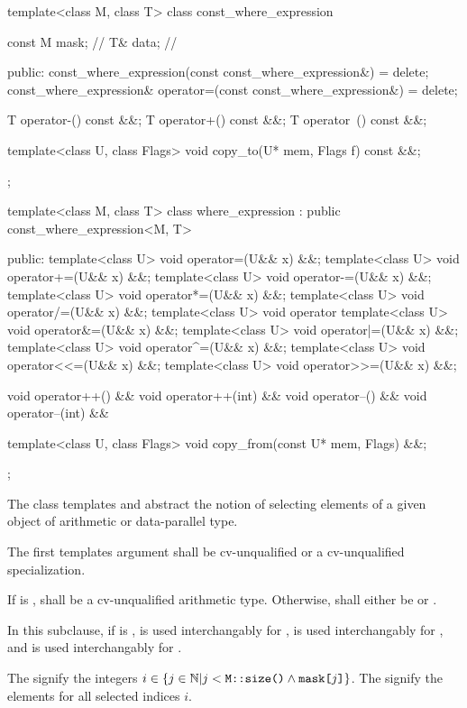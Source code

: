 \begin{codeblock}
template<class M, class T> class const_where_expression {
  const M mask; // \expos
  T& data; // \expos

public:
  const_where_expression(const const_where_expression&) = delete;
  const_where_expression& operator=(const const_where_expression&) = delete;

  T operator-() const &&;
  T operator+() const &&;
  T operator~() const &&;

  template<class U, class Flags> void copy_to(U* mem, Flags f) const &&;
};

template<class M, class T>
class where_expression : public const_where_expression<M, T> {
public:
  template<class U> void operator=(U&& x) &&;
  template<class U> void operator+=(U&& x) &&;
  template<class U> void operator-=(U&& x) &&;
  template<class U> void operator*=(U&& x) &&;
  template<class U> void operator/=(U&& x) &&;
  template<class U> void operator%
  template<class U> void operator&=(U&& x) &&;
  template<class U> void operator|=(U&& x) &&;
  template<class U> void operator^=(U&& x) &&;
  template<class U> void operator<<=(U&& x) &&;
  template<class U> void operator>>=(U&& x) &&;

  void operator++() &&
  void operator++(int) &&
  void operator--() &&
  void operator--(int) &&

  template<class U, class Flags> void copy_from(const U* mem, Flags) &&;
};
\end{codeblock}

\pnum
The class templates  and  abstract the notion of selecting elements of a given object of arithmetic or data-parallel type.

\pnum
The first templates argument  shall be cv-unqualified  or a cv-unqualified  specialization.

\pnum
If  is ,  shall be a cv-unqualified arithmetic type. Otherwise,  shall either be  or .

\pnum
In this subclause, if  is ,  is used interchangably for ,  is used interchangably for , and  is used interchangably for .

\pnum
The  signify the integers $i \in \{j \in \mathbb{N} | j < \texttt{M::size()} \wedge \texttt{mask[}j\texttt{]}\}$. The  signify the elements  for all selected indices $i$.


